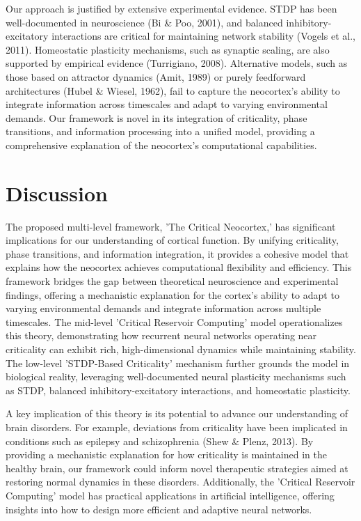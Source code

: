 \documentclass{article}
\begin{document}
Our approach is justified by extensive experimental evidence. STDP has been well-documented in neuroscience (Bi & Poo, 2001), and balanced inhibitory-excitatory interactions are critical for maintaining network stability (Vogels et al., 2011). Homeostatic plasticity mechanisms, such as synaptic scaling, are also supported by empirical evidence (Turrigiano, 2008). Alternative models, such as those based on attractor dynamics (Amit, 1989) or purely feedforward architectures (Hubel & Wiesel, 1962), fail to capture the neocortex's ability to integrate information across timescales and adapt to varying environmental demands. Our framework is novel in its integration of criticality, phase transitions, and information processing into a unified model, providing a comprehensive explanation of the neocortex's computational capabilities.

\section{Discussion}
The proposed multi-level framework, 'The Critical Neocortex,' has significant implications for our understanding of cortical function. By unifying criticality, phase transitions, and information integration, it provides a cohesive model that explains how the neocortex achieves computational flexibility and efficiency. This framework bridges the gap between theoretical neuroscience and experimental findings, offering a mechanistic explanation for the cortex's ability to adapt to varying environmental demands and integrate information across multiple timescales. The mid-level 'Critical Reservoir Computing' model operationalizes this theory, demonstrating how recurrent neural networks operating near criticality can exhibit rich, high-dimensional dynamics while maintaining stability. The low-level 'STDP-Based Criticality' mechanism further grounds the model in biological reality, leveraging well-documented neural plasticity mechanisms such as STDP, balanced inhibitory-excitatory interactions, and homeostatic plasticity.

A key implication of this theory is its potential to advance our understanding of brain disorders. For example, deviations from criticality have been implicated in conditions such as epilepsy and schizophrenia (Shew & Plenz, 2013). By providing a mechanistic explanation for how criticality is maintained in the healthy brain, our framework could inform novel therapeutic strategies aimed at restoring normal dynamics in these disorders. Additionally, the 'Critical Reservoir Computing' model has practical applications in artificial intelligence, offering insights into how to design more efficient and adaptive neural networks.
\end{document}
